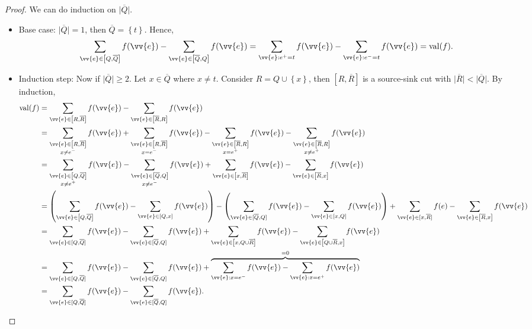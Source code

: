 \begin{proof}
    We can do induction on \(\vert \overline{Q} \vert \). 
    \begin{itemize}
        \item Base case: \(\vert \overline{Q} \vert = 1\), then \(\overline{Q} = \left\{ t \right\} \). Hence,
        \[
            \sum_{\vv{e} \in \left[ Q, \overline{Q} \right] } f(\vv{e}) - \sum_{\vv{e} \in \left[ \overline{Q} , Q \right] } f(\vv{e}) = \sum_{\vv{e}: e^+ = t} f(\vv{e}) - \sum_{\vv{e}: e^- = t} f(\vv{e}) = \mathrm{val}(f). 
        \]
        \item Induction step: Now if \(\vert \overline{Q} \vert \ge 2 \). Let \(x \in \overline{Q}\) where \(x \neq t\). Consider \(R = Q \cup \left\{ x \right\} \), then \(\left[ R, \overline{R}  \right] \) is a source-sink cut with \(\vert \overline{R} \vert < \vert \overline{Q} \vert  \). By induction,
        \begin{align*}
            \mathrm{val}(f) &= \sum_{\vv{e} \in \left[ R, \overline{R} \right] } f(\vv{e}) - \sum_{\vv{e} \in \left[ \overline{R} , R \right] } f(\vv{e}) \\
            &= \sum_{\substack{\vv{e} \in \left[ R, \overline{R} \right] \\ x \neq e^- }} f(\vv{e}) + \sum_{\substack{\vv{e} \in \left[ R, \overline{R} \right] \\ x = e^- }} f(\vv{e}) - \sum_{\substack{\vv{e} \in \left[ \overline{R}, R \right] \\ x = e^+ }} f(\vv{e}) - \sum_{\substack{\vv{e} \in \left[ \overline{R}, R \right] \\ x \neq e^+ }} f(\vv{e}) \\
            &= \sum_{\substack{\vv{e} \in \left[ Q, \overline{Q} \right] \\ x \neq e^+ }} f(\vv{e}) - \sum_{\substack{\vv{e} \in \left[ \overline{Q}, Q \right] \\ x \neq e^- }} f(\vv{e}) + \sum_{\vv{e} \in \left[ x, \overline{R} \right] } f(\vv{e}) - \sum_{\vv{e} \in \left[ \overline{R} , x \right] } f(\vv{e}) \\
            &= \left( \sum_{\vv{e} \in \left[ Q, \overline{Q} \right] } f(\vv{e}) - \sum_{\vv{e} \in [Q, x]} f(\vv{e}) \right) - \left( \sum_{\vv{e} \in [\overline{Q} , Q]} f(\vv{e}) - \sum_{\vv{e} \in [x, Q]} f(\vv{e}) \right)  + \sum_{\vv{e} \in [x, \overline{R}]} f(e) - \sum_{\vv{e} \in \left[ \overline{R} , x \right] } f(\vv{e}) \\
            &= \sum_{\vv{e} \in [Q, \overline{Q}]} f(\vv{e}) - \sum_{\vv{e} \in [\overline{Q}, Q]} f(\vv{e}) + \sum_{\vv{e} \in \left[ x, Q \cup \overline{R} \right] } f(\vv{e}) - \sum_{\vv{e} \in \left[ Q \cup \overline{R}, x \right] } f(\vv{e}) \\
            &= \sum_{\vv{e} \in [Q, \overline{Q}]} f(\vv{e}) - \sum_{\vv{e} \in [\overline{Q}, Q]} f(\vv{e}) + \overbrace{\sum_{\vv{e}: x=e^-} f(\vv{e}) - \sum_{\vv{e}: x = e^+} f(\vv{e}) }^{=0} \\
            &= \sum_{\vv{e} \in [Q, \overline{Q}]} f(\vv{e}) - \sum_{\vv{e} \in [\overline{Q}, Q]} f(\vv{e}).             
        \end{align*}
    \end{itemize} 
\end{proof}